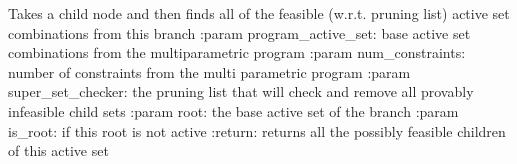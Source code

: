 \documentclass[letterpaper,10pt,english]{sphinxmanual}
\begin{document}

\begin{fulllineitems}
\label{\detokenize{mpo.mp_solvers:mpo.mp_solvers.mpqp_combinatorial.generate_children}}
\sphinxAtStartPar
Takes a child node and then finds all of the feasible (w.r.t. pruning list) active set combinations from this branch
:param program\_active\_set: base active set combinations from the multiparametric program
:param num\_constraints: number of constraints from the multi parametric program
:param super\_set\_checker: the pruning list that will check and remove all provably infeasible child sets
:param root: the base active set of the branch
:param is\_root: if this root is not active
:return: returns all the possibly feasible children of this active set

\end{fulllineitems}

\end{document}

